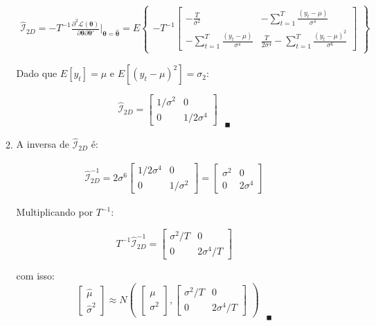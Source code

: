 \begin{enumerate}
\begin{enumerate}
			
		\begin{align*}
			\mathscr{\hat{I}}_{2D}=-T^{-1}\frac{\partial^2 \mathscr{L}(\boldsymbol{\theta})}{\partial\boldsymbol{\theta}\partial\boldsymbol{\theta}'}\Bigg|_{\boldsymbol{\theta}=\hat{\boldsymbol{\theta}}}=E\begin{Bmatrix}-T^{-1}\begin{bmatrix}
				-\frac{T}{\sigma^2}&-\sum\limits_{t=1}^T\frac{(y_t-\mu)}{\sigma^4}\\
				-\sum\limits_{t=1}^T\frac{(y_t-\mu)}{\sigma^4}&\frac{T}{2\sigma^4}-\sum\limits_{t=1}^T\frac{(y_t-\mu)^2}{\sigma^6}
			\end{bmatrix}\end{Bmatrix}
		\end{align*}
	\pagebreak
	
	Dado que $E[y_t]=\mu$ e $E[(y_t-\mu)^2]=\sigma_2$:
	
			$$\mathscr{\hat{I}}_{2D}=\begin{bmatrix}
			{1}/{\sigma^2}&0\\
			0&{1}/{2\sigma^4}
			\end{bmatrix}_{\quad\blacksquare}$$
			
	\item %
	
	A inversa de  $\mathscr{\hat{I}}_{2D}$ é:
	
	\begin{align*}
		\mathscr{\hat{I}}_{2D}^{-1}={2\sigma^6}\begin{bmatrix}
		{1}/{2\sigma^4}	&0\\
			0&{1}/{\sigma^2}\end{bmatrix}
		=\begin{bmatrix}
			\sigma^2	&0\\
			0&2\sigma^4\end{bmatrix}
	\end{align*}

	Multiplicando por $T^{-1}$:
	
	$$T^{-1}\mathscr{\hat{I}}_{2D}^{-1}=\begin{bmatrix}
	\sigma^2/T	&0\\
	0&2\sigma^4/T\end{bmatrix}$$
	
	com isso: 
	$$\begin{bmatrix}
	\hat{\mu}\\
	\hat{\sigma}^2
	\end{bmatrix}\approx N \begin{pmatrix}
	\begin{bmatrix}
	\mu\\
	\sigma^2
	\end{bmatrix},
	\begin{bmatrix}
	\sigma^2/T	&0\\
	0&2\sigma^4/T\end{bmatrix}
	\end{pmatrix}_{\quad\blacksquare}$$
	\end{enumerate}
	
\end{enumerate}